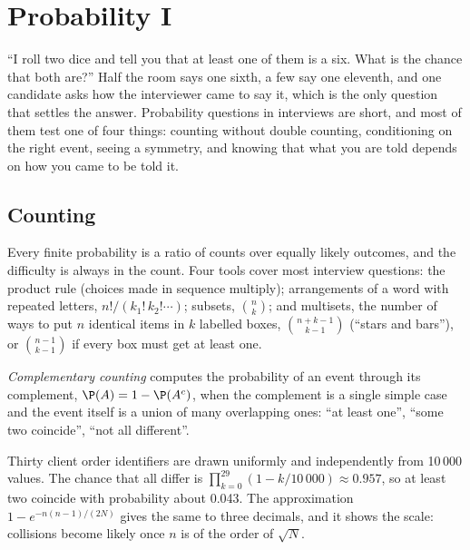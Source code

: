 \chapter{Probability I}\label{ch:iv:probability-i}

``I roll two dice and tell you that at least one of them is a six. What is the chance that both are?'' Half the
room says one sixth, a few say one eleventh, and one candidate asks how the interviewer came to say it, which
is the only question that settles the answer. Probability questions in interviews are short, and most of them
test one of four things: counting without double counting, conditioning on the right event, seeing a symmetry,
and knowing that what you are told depends on how you came to be told it.

\section{Counting}

Every finite probability is a ratio of counts over equally likely outcomes, and the difficulty is always in the
count. Four tools cover most interview questions: the product rule (choices made in sequence multiply);
arrangements of a word with repeated letters, $n!/(k_1!\,k_2!\cdots)$; subsets, $\binom nk$; and multisets, the
number of ways to put $n$ identical items in $k$ labelled boxes, $\binom{n+k-1}{k-1}$ (``stars and bars''), or
$\binom{n-1}{k-1}$ if every box must get at least one.

\begin{definition}\label{def:iv:probability-i:complement}
\emph{Complementary counting} computes the probability of an event through its
complement, $\P(A) = 1 - \P(A^c)$, when the complement is a single simple case and the event itself is a union of
many overlapping ones: ``at least one'', ``some two coincide'', ``not all different''.
\end{definition}

\begin{example}\label{ex:iv:probability-i:ids}
Thirty client order identifiers are drawn uniformly and independently from 10\,000 values. The chance that all
differ is $\prod_{k=0}^{29}(1 - k/10\,000) \approx 0.957$, so at least two coincide with probability about 0.043.
The approximation $1 - e^{-n(n-1)/(2N)}$ gives the same to three decimals, and it shows the scale: collisions
become likely once $n$ is of the order of $\sqrt N$.
\end{example}

